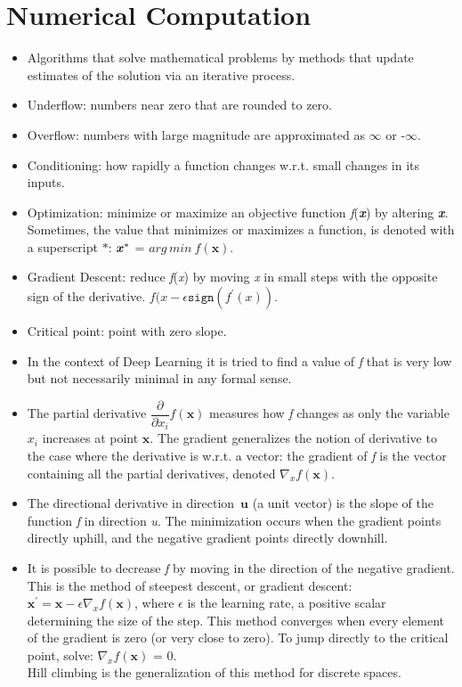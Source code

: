 \documentclass{article}
\begin{document}
\section{Numerical Computation}
\begin{itemize}
\item Algorithms that solve mathematical problems by methods that update estimates of the solution via an iterative process.
\item Underflow: numbers near zero that are rounded to zero.
\item Overflow: numbers with large magnitude are approximated as \(\infty\) or -\(\infty\).
\item Conditioning: how rapidly a function changes w.r.t. small changes in its inputs.
\item Optimization: minimize or maximize an objective function \textit{f}(\textbf{\textit{x}}) by altering \textbf{\textit{x}}. Sometimes, the value that minimizes or maximizes a function, is denoted with a superscript \(\ast\): \(\textbf{\textit{x}}^\ast\) = \(arg\,min\ f(\boldsymbol{x})\).
\item Gradient Descent: reduce \textit{f}(\textit{x}) by moving \textit{x} in small steps with the opposite sign of the derivative. \(f(x - \epsilon\mathtt{sign}(f^{\prime}(x))\).
\item Critical point: point with zero slope.
\item In the context of Deep Learning it is tried to find a value of \textit{f} that is very low but not necessarily minimal in any formal sense.
\item The partial derivative \(\dfrac{\partial}{\partial x_i}f(\boldsymbol{x})\) measures how \textit{f} changes as only the variable \(x_i\) increases at point \(\boldsymbol{x}\). The gradient generalizes the notion of derivative to the case where the derivative is w.r.t. a vector: the gradient of \textit{f} is the vector containing all the partial derivatives, denoted \(\nabla_xf(\boldsymbol{x})\).
\item The directional derivative in direction \(\boldsymbol{u}\) (a unit vector) is the slope of the function \textit{f} in direction \textit{u}. The minimization occurs when the gradient points directly uphill, and the negative gradient points directly downhill.
\item It is possible to decrease \textit{f} by moving in the direction of the negative gradient. This is the method of steepest descent, or gradient descent: \(\boldsymbol{x}^\prime = \boldsymbol{x} - \epsilon\nabla_xf(\boldsymbol{x})\), where \(\epsilon\) is the learning rate, a positive scalar determining the size of the step. This method converges when every element of the gradient is zero (or very close to zero). To jump directly to the critical point, solve: \(\nabla_xf(\boldsymbol{x})\) = 0.\\Hill climbing is the generalization of this method for discrete spaces.

\end{itemize}
\end{document}
